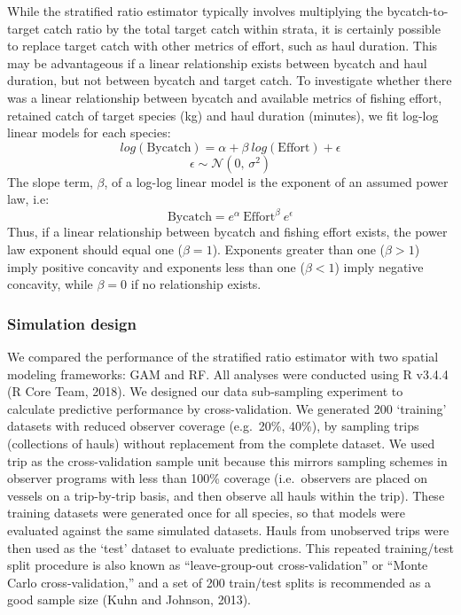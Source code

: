 \documentclass[]{article}
\begin{document}
While the stratified ratio estimator typically involves multiplying the
bycatch-to-target catch ratio by the total target catch within strata,
it is certainly possible to replace target catch with other metrics of
effort, such as haul duration. This may be advantageous if a linear
relationship exists between bycatch and haul duration, but not between
bycatch and target catch. To investigate whether there was a linear
relationship between bycatch and available metrics of fishing effort,
retained catch of target species (kg) and haul duration (minutes), we
fit log-log linear models for each species:
\[ log(\text{Bycatch}) = \alpha + \beta \ log(\text{Effort}) + \epsilon\]
\[ \epsilon \sim \mathcal{N}(0,\,\sigma^{2})\] The slope term,
\(\beta\), of a log-log linear model is the exponent of an assumed power
law, i.e:
\[ \text{Bycatch} = e^\alpha \ \text{Effort}^{\beta} \ e^\epsilon\]
Thus, if a linear relationship between bycatch and fishing effort
exists, the power law exponent should equal one (\(\beta = 1\)).
Exponents greater than one (\(\beta > 1\)) imply positive concavity and
exponents less than one (\(\beta < 1\)) imply negative concavity, while
\(\beta = 0\) if no relationship exists.

\hypertarget{simulation-design}{%
\subsubsection{Simulation design}\label{simulation-design}}

We compared the performance of the stratified ratio estimator with two
spatial modeling frameworks: GAM and RF. All analyses were conducted
using R v3.4.4 (R Core Team, 2018). We designed our data sub-sampling
experiment to calculate predictive performance by cross-validation. We
generated 200 `training' datasets with reduced observer coverage
(e.g.~20\%, 40\%), by sampling trips (collections of hauls) without
replacement from the complete dataset. We used trip as the
cross-validation sample unit because this mirrors sampling schemes in
observer programs with less than 100\% coverage (i.e.~observers are
placed on vessels on a trip-by-trip basis, and then observe all hauls
within the trip). These training datasets were generated once for all
species, so that models were evaluated against the same simulated
datasets. Hauls from unobserved trips were then used as the `test'
dataset to evaluate predictions. This repeated training/test split
procedure is also known as ``leave-group-out cross-validation'' or
``Monte Carlo cross-validation,'' and a set of 200 train/test splits is
recommended as a good sample size (Kuhn and Johnson, 2013).
\end{document}

